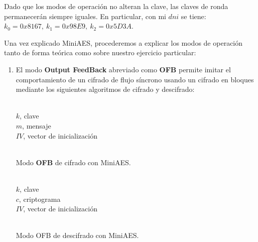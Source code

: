 	Dado que los modos de operación no alteran la clave, las claves de ronda permanecerán siempre iguales. En
	particular, con mi $dni$ se tiene: $k_0 = 0x8167,\ k_1 = 0x98E9,\ k_2 = 0x5D3A$.
	
	Una vez explicado MiniAES, procederemos a explicar los modos de operación tanto de forma teórica como sobre
	nuestro ejercicio particular:
	
	\begin{enumerate}
		\item El modo \textbf{Output FeedBack} abreviado como \textbf{OFB} permite imitar el comportamiento de
		un cifrado de flujo síncrono usando un cifrado en bloques mediante los siguientes algoritmos de cifrado
		y descifrado:
		\begin{algorithm}[H]
			\begin{algorithmic}[1]
				\REQUIRE \ \\
					\texttt{$k$}, clave\\
					\texttt{$m$}, mensaje\\
					\texttt{$IV$}, vector de inicialización\\ \
				\ENDFOR
			\end{algorithmic}
			\caption{Modo \textbf{OFB} de cifrado con MiniAES.}
			\label{EncOFB}
		\end{algorithm}
		
		\begin{algorithm}[H]
			\begin{algorithmic}[1]
				\REQUIRE \ \\
					\texttt{$k$}, clave\\
					\texttt{$c$}, criptograma\\
					\texttt{$IV$}, vector de inicialización\\ \
				\STATE{\texttt{$x = IV$}}
				\ENDFOR
			\end{algorithmic}
			\caption{Modo OFB de descifrado con MiniAES.}
			\label{DecOFB}
		\end{algorithm}
		

\end{enumerate}
